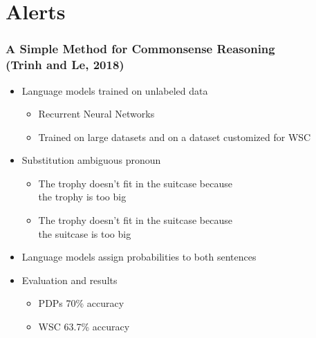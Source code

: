 \documentclass[c,8pt,xcolor...,x11names]{beamer}
\begin{document}
\section{Alerts}
\begin{frame}[fragile] 
\frametitle{A Simple Method for Commonsense Reasoning\\ (Trinh and Le, 2018)}
	\begin{itemize}
	\normalsize
			\item \alert{Language models} trained on unlabeled data
	\onslide<2->		\begin{itemize}
		\normalsize
		\item Recurrent Neural Networks
		\item Trained on large datasets and on a dataset \alert{customized} for WSC
	\end{itemize}
			\item Substitution ambiguous pronoun
	\onslide<3->		\begin{itemize}
		\normalsize
		\item The trophy doesn't fit in the suitcase because\\ the \alert{trophy} is too big
		\item The trophy doesn't fit in the suitcase because\\ the \alert{suitcase} is too big
	\end{itemize}
			\item Language models assign probabilities to both sentences
	
		\item Evaluation and results
	\begin{itemize}
		\normalsize
		\item PDPs 70\% accuracy
		\item WSC \alert{63.7\%} accuracy
	\end{itemize}
\end{itemize}
\end{frame}
\end{document}
